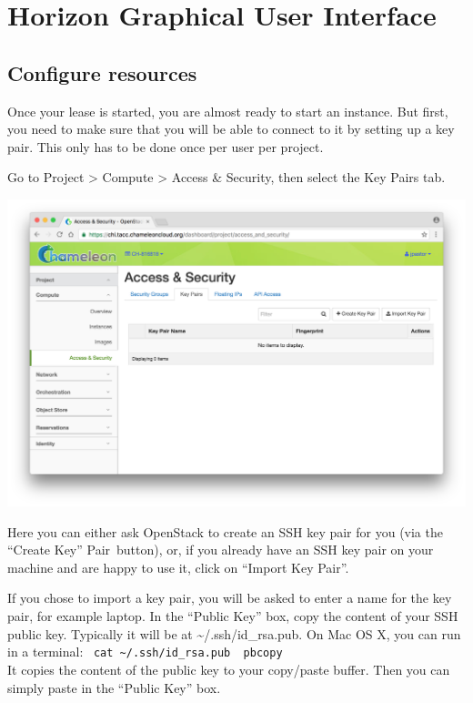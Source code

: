 \FILENAME

\section{Horizon Graphical User Interface}
\label{C:cc-horizon}

\subsection{Configure resources}

Once your lease is started, you are almost ready to start an instance.
But first, you need to make sure that you will be able to connect to
it by setting up a key pair. This only has to be done once per user
per project.

Go to Project \textgreater{} Compute \textgreater{} Access \& Security,
then select the Key Pairs tab.

\includegraphics[width=0.8\columnwidth]{images/chameleon/Screen-Shot-2016-10-26-at-14-37-00.png}

Here you can either ask OpenStack to create an SSH key pair for you (via
the ``Create Key'' Pair~button), or, if you already have an SSH key pair
on your machine and are happy to use it, click on ``Import Key Pair''.

If you chose to import a key pair, you will be asked to enter a name for
the key pair, for example laptop. In the ``Public Key'' box, copy the
content of your SSH public key. Typically it will be at
\textasciitilde{}/.ssh/id\_rsa.pub. On Mac OS X, you can run in a
terminal:
~\texttt{cat\ \textasciitilde{}/.ssh/id\_rsa.pub\ \textbar{}\ pbcopy}\\
It copies the content of the public key to your copy/paste buffer. Then
you can simply paste in the ``Public Key'' box.

